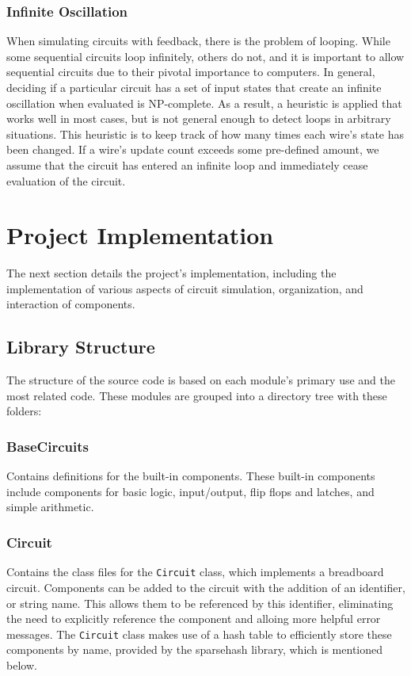 \documentclass{article}
\newcommand{\ClassName}[1]{\texttt{#1}}
\begin{document}
\subsubsection{Infinite Oscillation}

When simulating circuits with feedback, there is the problem of looping. While some sequential circuits loop infinitely, others do not, and it is important to allow sequential circuits due to their pivotal importance to computers. In general, deciding if a particular circuit has a set of input states that create an infinite oscillation when evaluated is NP-complete. As a result, a heuristic is applied that works well in most cases, but is not general enough to detect loops in arbitrary situations. This heuristic is to keep track of how many times each wire’s state has been changed. If a wire's update count exceeds some pre-defined amount, we assume that the circuit has entered an infinite loop and immediately cease evaluation of the circuit.

\section{Project Implementation}

The next section details the project’s implementation, including the implementation of various aspects of circuit simulation, organization, and interaction of components.

\subsection{Library Structure}

The structure of the source code is based on each module’s primary use and the most related code. These modules are grouped into a directory tree with these folders:

\subsubsection{BaseCircuits}

Contains definitions for the built-in components. These built-in components include components for basic logic, input/output, flip flops and latches, and simple arithmetic.

\subsubsection{Circuit}

Contains the class files for the \ClassName{Circuit} class, which implements a breadboard circuit. Components can be added to the circuit with the addition of an identifier, or string name. This allows them to be referenced by this identifier, eliminating the need to explicitly reference the component and alloing more helpful error messages. The \ClassName{Circuit} class makes use of a hash table to efficiently store these components by name, provided by the sparsehash library, which is mentioned below.
\end{document}
